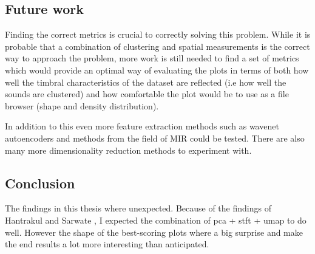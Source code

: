 \documentclass[11pt]{article}
\begin{document}


\subsection{Future work}
\label{sec:org1054556}

Finding the correct metrics is crucial to correctly solving this problem. While it is probable that a combination of clustering and spatial measurements is the correct way to approach the problem, more work is still needed to find a set of metrics which would provide an optimal way of evaluating the plots in terms of both how well the timbral characteristics of the dataset are reflected (i.e how well the sounds are clustered) and how comfortable the plot would be to use as a file browser (shape and density distribution).

In addition to this even more feature extraction methods such as wavenet autoencoders and methods from the field of MIR could be tested. There are also many more dimensionality reduction methods to experiment with.
\subsection{Conclusion}
\label{sec:orgf2b4e9e}

The findings in this thesis where unexpected. Because of the findings of Hantrakul and Sarwate \cite{klustr}, I expected the combination of pca + stft + umap to do well. However the shape of the best-scoring plots where a big surprise and make the end results a lot more interesting than anticipated.



\end{document}
